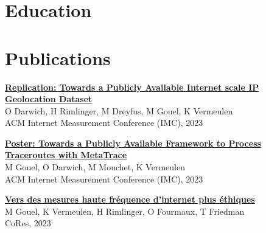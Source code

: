 \documentclass[11pt,a4paper,sans]{moderncv} %
\begin{document}

\section{Education}



\section{Publications}

\href{https://hal.science/hal-04215113/document}{\textbf{Replication: Towards a Publicly Available Internet scale IP Geolocation Dataset}}\\
O Darwich, H Rimlinger, M Dreyfus, M Gouel, K Vermeulen\\
ACM Internet Measurement Conference (IMC), 2023

\vspace{0.25cm}
\href{https://hal.science/hal-04218315v1/document}{\textbf{Poster: Towards a Publicly Available Framework to Process Traceroutes with MetaTrace}}\\
M Gouel, O Darwich, M Mouchet, K Vermeulen\\
ACM Internet Measurement Conference (IMC), 2023

\vspace{0.25cm}
\href{https://hal.science/hal-04090683v1/document}{\textbf{Vers des mesures haute fréquence d'internet plus éthiques}}\\
M Gouel, K Vermeulen, H Rimlinger, O Fourmaux, T Friedman\\
CoRes, 2023
\end{document}
